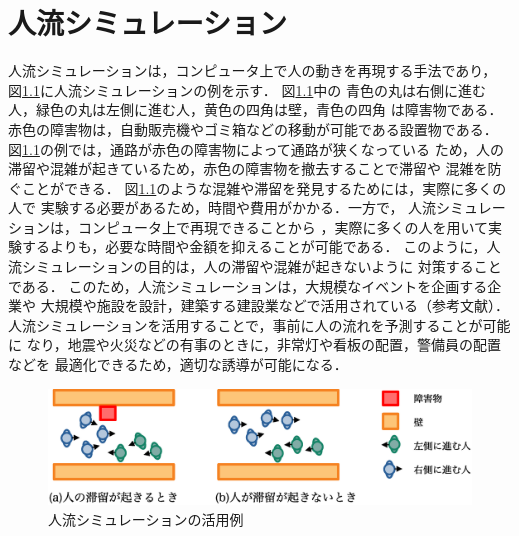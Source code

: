 
\newcommand{\figtb}[5]{ %
\begin{figure}[tb]
  \begin{center}
    \texttt{[image: figure/\#4]}
    \caption{#1}
    \ecaption{#2}
    \label{fig:#5}
  \end{center}
\end{figure}}
\newcommand{\eq}[1]{式（\ref{eq:#1}）}
\chapter{人流シミュレーション}
\label{sec:background}
人流シミュレーションは，コンピュータ上で人の動きを再現する手法であり，
図\ref{fig:jinryu_image}に人流シミュレーションの例を示す．
図\ref{fig:jinryu_image}中の
青色の丸は右側に進む人，緑色の丸は左側に進む人，黄色の四角は壁，青色の四角
は障害物である．
赤色の障害物は，自動販売機やゴミ箱などの移動が可能である設置物である．
図\ref{fig:jinryu_image}の例では，通路が赤色の障害物によって通路が狭くなっている
ため，人の滞留や混雑が起きているため，赤色の障害物を撤去することで滞留や
混雑を防ぐことができる．
図\ref{fig:jinryu_image}のような混雑や滞留を発見するためには，実際に多くの人で
実験する必要があるため，時間や費用がかかる．一方で，
人流シミュレーションは，コンピュータ上で再現できることから
，実際に多くの人を用いて実験するよりも，必要な時間や金額を抑えることが可能である．
このように，人流シミュレーションの目的は，人の滞留や混雑が起きないように
対策することである．
このため，人流シミュレーションは，大規模なイベントを企画する企業や
大規模や施設を設計，建築する建設業などで活用されている（参考文献）．
人流シミュレーションを活用することで，事前に人の流れを予測することが可能に
なり，地震や火災などの有事のときに，非常灯や看板の配置，警備員の配置などを
最適化できるため，適切な誘導が可能になる．
%
\begin{figure}[b]
    \begin{center}
     \includegraphics[width=14cm,clip]{figure/jinryu_image2_r2.eps}
     \caption{人流シミュレーションの活用例}
     \label{fig:jinryu_image}
    \end{center}
\end{figure}
